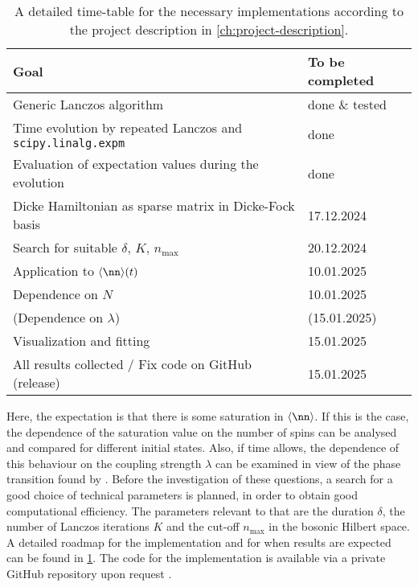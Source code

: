 \begin{table}[ht]
    \caption{A detailed time-table for the necessary implementations according to the project description in \cref{ch:project-description}.}
    \label{tab:roadmap}
    \centering
    \begin{tabular*}{\textwidth}{@{}l@{\extracolsep{\fill}}l@{}}
        \toprule
        Goal & To be completed \\
        \midrule
        Generic Lanczos algorithm & done \& tested  \\
        Time evolution by repeated Lanczos and \texttt{scipy.linalg.expm} & done \\
        Evaluation of expectation values during the evolution & done \\
        Dicke Hamiltonian as sparse matrix in Dicke-Fock basis & 17.12.2024 \\
        Search for suitable \(\delta,\, K,\, n_{\mathrm{max}}\) & 20.12.2024 \\
        Application to \(\langle \nn \rangle (t)\) & 10.01.2025 \\
        Dependence on \(N\) & 10.01.2025 \\
        (Dependence on \(\lambda\)) & (15.01.2025) \\
        Visualization and fitting & 15.01.2025 \\
        All results collected / Fix code on GitHub (release) & 15.01.2025 \\
        \bottomrule
    \end{tabular*}
\end{table}

Here, the expectation is that there is some saturation in \(\langle \nn \rangle\). 
If this is the case, the dependence of the saturation value on the number of spins can be analysed and compared for different initial states. 
Also, if time allows, the dependence of this behaviour on the coupling strength \(\lambda\) can be examined in view of the phase transition found by \textcite{heppSuperradiantPhaseTransition1973}.
Before the investigation of these questions, a search for a good choice of technical parameters is planned, in order to obtain good computational efficiency.
The parameters relevant to that are the duration \(\delta\), the number of Lanczos iterations \(K\) and the cut-off \(n_{\mathrm{max}}\) in the bosonic Hilbert space.
A detailed roadmap for the implementation and for when results are expected can be found in \cref{tab:roadmap}.
The code for the implementation is available via a private GitHub repository upon request \cite{richterImplementationsSimulationDicke}.

